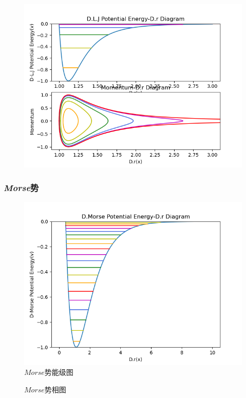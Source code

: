 \documentclass[11pt, a4paper, oneside]{ctexart}
\begin{document}
{{{\begin{appendices}
{\begin{figure}[!ht]
            \centering
            \includegraphics[scale=0.75]{h23.png}
        \end{figure} 
    }
    \subsubsection{\emph{Morse}势}
    {
        \begin{figure}[!ht]
            \caption{ $Morse$势能级图}
            \centering
            \includegraphics[scale=0.75]{h2-1.png}
        \end{figure} 
        \begin{figure}[!ht]
            \caption{ $Morse$势相图}
	

\end{figure}}
\end{appendices}}}}
\end{document}
